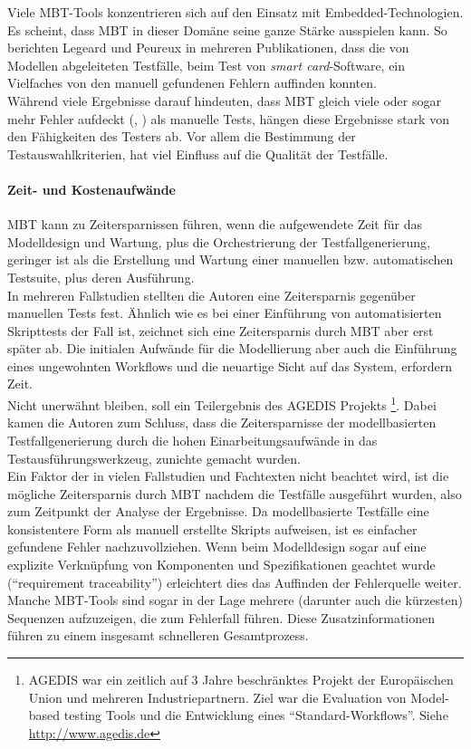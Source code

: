 Viele MBT-Tools konzentrieren sich auf den Einsatz mit Embedded-Technologien. Es scheint, dass MBT in dieser Domäne seine ganze Stärke ausspielen kann. So berichten Legeard und Peureux in mehreren Publikationen, dass die von Modellen abgeleiteten Testfälle,  beim Test von \textit{smart card}-Software, ein Vielfaches von den manuell gefundenen Fehlern auffinden konnten.\cite{legeard_generation_2001}\\
Während viele Ergebnisse darauf hindeuten, dass MBT gleich viele oder sogar mehr Fehler aufdeckt (\cite{dalal_model-based_1999}, \cite{legeard_generation_2001}) als manuelle Tests, hängen diese Ergebnisse stark von den Fähigkeiten des Testers ab. Vor allem die Bestimmung der Testauswahlkriterien, hat viel Einfluss auf die Qualität der Testfälle.\cite{utting_practical_2007}

\paragraph{Zeit- und Kostenaufwände} MBT kann zu Zeitersparnissen führen, wenn die aufgewendete Zeit für das Modelldesign und Wartung, plus die Orchestrierung der Testfallgenerierung, geringer ist als die Erstellung und Wartung einer manuellen bzw. automatischen Testsuite, plus deren Ausführung.\\
In mehreren Fallstudien stellten die Autoren eine Zeitersparnis gegenüber manuellen Tests fest.\cite{farchi_using_2002}\cite{prenninger_mbt_2005}\cite{pretschner_one_2005} Ähnlich wie es bei einer Einführung von automatisierten Skripttests der Fall ist, zeichnet sich eine Zeitersparnis durch MBT aber erst später ab. Die initialen Aufwände für die Modellierung aber auch die Einführung eines ungewohnten Workflows und die neuartige Sicht auf das System, erfordern Zeit.\\
Nicht unerwähnt bleiben, soll ein Teilergebnis des AGEDIS Projekts \footnote{AGEDIS war ein zeitlich auf 3 Jahre beschränktes Projekt der Europäischen Union und mehreren Industriepartnern. Ziel war die Evaluation von Model-based testing Tools und die Entwicklung eines ``Standard-Workflows''. Siehe \url{http://www.agedis.de}}. Dabei kamen die Autoren zum Schluss, dass die Zeitersparnisse der modellbasierten Testfallgenerierung durch die hohen Einarbeitungsaufwände in das Testausführungswerkzeug, zunichte gemacht wurden.\cite{craggs_agedis_2003}\\
Ein Faktor der in vielen Fallstudien und Fachtexten nicht beachtet wird, ist die mögliche Zeitersparnis durch MBT nachdem die Testfälle ausgeführt wurden, also zum Zeitpunkt der Analyse der Ergebnisse. Da modellbasierte Testfälle eine konsistentere Form als manuell erstellte Skripts aufweisen, ist es einfacher gefundene Fehler nachzuvollziehen. Wenn beim Modelldesign sogar auf eine explizite Verknüpfung von Komponenten und Spezifikationen geachtet wurde (``requirement traceability'') erleichtert dies das Auffinden der Fehlerquelle weiter. Manche MBT-Tools sind sogar in der Lage mehrere (darunter auch die kürzesten) Sequenzen aufzuzeigen, die zum Fehlerfall führen. Diese Zusatzinformationen führen zu einem insgesamt schnelleren Gesamtprozess.\cite{utting_practical_2007}

